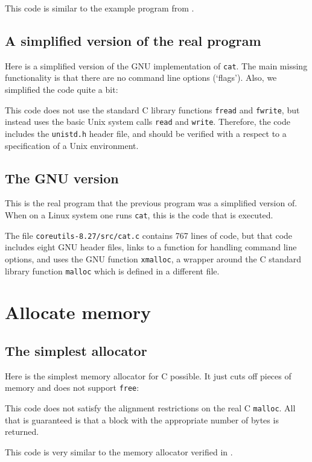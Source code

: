 \documentclass{article}
\begin{document}
This code is similar to the example program from \cite{gun:myr:kum:nor:17}.

\subsection{A simplified version of the real program}
Here is a simplified version of the GNU implementation of \texttt{cat}.
The main missing functionality is that there are no command line options (`flags').
Also, we simplified the code quite a bit:

This code does not use the standard C library functions
\texttt{fread} and \texttt{fwrite}, but instead
uses the basic Unix system calls \texttt{read} and \texttt{write}.
Therefore, the code includes the \texttt{unistd.h} header file,
and should be verified with a respect to a specification of a Unix
environment.

\subsection{The GNU version}
This is the real program that the previous program was a simplified version of.
When on a Linux system one runs \texttt{cat}, this is the code that is
executed.

The file \texttt{coreutils-8.27/src/cat.c} contains 767 lines of code,
but that code includes eight GNU header files,
links to a function for handling command line options, and uses
the GNU function \texttt{xmalloc}, a wrapper around the C standard library function
\texttt{malloc} which is defined in a different file.
\addtocounter{lstlisting}{1}

\section{Allocate memory}
\subsection{The simplest allocator}
Here is the simplest memory allocator for C possible.
It just cuts off pieces of memory and does not support \texttt{free}:

This code does not satisfy the alignment restrictions on the real
C \texttt{malloc}.
All that is guaranteed is that a block with the appropriate number of bytes is
returned.

This code is very similar to the memory allocator verified in \cite{ben:06,ben:06:1}.
\end{document}
